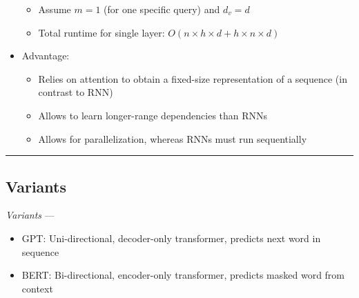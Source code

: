 \begin{itemize}
\begin{itemize}
         \item Assume $m = 1$ (for one specific query) and $d_v = d$
         \item Total runtime for single layer: $O(n \times h \times d + h \times n \times d)$
    \end{itemize}
    \item Advantage: 
    \begin{itemize}
        \item Relies on attention to obtain a fixed-size representation of a sequence (in contrast to RNN)
        \item Allows to learn longer-range dependencies than RNNs
        \item Allows for parallelization, whereas RNNs must run sequentially
    \end{itemize}
\end{itemize}

{\color{black}\hrule height 0.001mm}

\subsection*{Variants}
\emph{Variants} --- 
\begin{itemize}
    \item GPT: Uni-directional, decoder-only transformer, predicts next word in sequence
    \item BERT: Bi-directional, encoder-only transformer, predicts masked word from context
\end{itemize}

